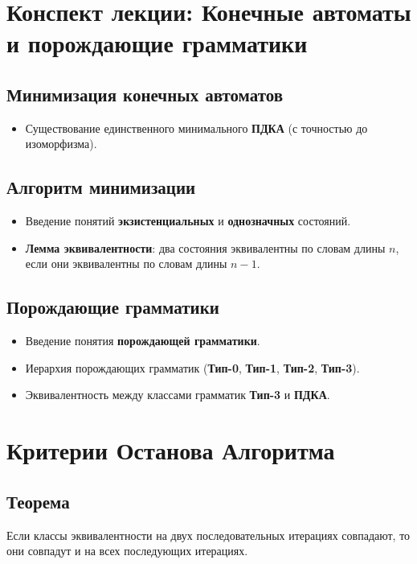\documentclass{article}
\begin{document}
\section{Конспект лекции: Конечные автоматы и порождающие грамматики}

\subsection{Минимизация конечных автоматов}
\begin{itemize}
    \item Существование единственного минимального \textbf{ПДКА} (с точностью до изоморфизма).
\end{itemize}

\subsection{Алгоритм минимизации}
\begin{itemize}
    \item Введение понятий \textbf{экзистенциальных} и \textbf{однозначных} состояний.
    \item \textbf{Лемма эквивалентности}: два состояния эквивалентны по словам длины $n$, если они эквивалентны по словам длины $n-1$.
\end{itemize}

\subsection{Порождающие грамматики}
\begin{itemize}
    \item Введение понятия \textbf{порождающей грамматики}.
    \item Иерархия порождающих грамматик (\textbf{Тип-0}, \textbf{Тип-1}, \textbf{Тип-2}, \textbf{Тип-3}).
    \item Эквивалентность между классами грамматик \textbf{Тип-3} и \textbf{ПДКА}.
\end{itemize}
\section{Критерии Останова Алгоритма}

\subsection{Теорема}
Если классы эквивалентности на двух последовательных итерациях совпадают, то они совпадут и на всех последующих итерациях.
\end{document}
